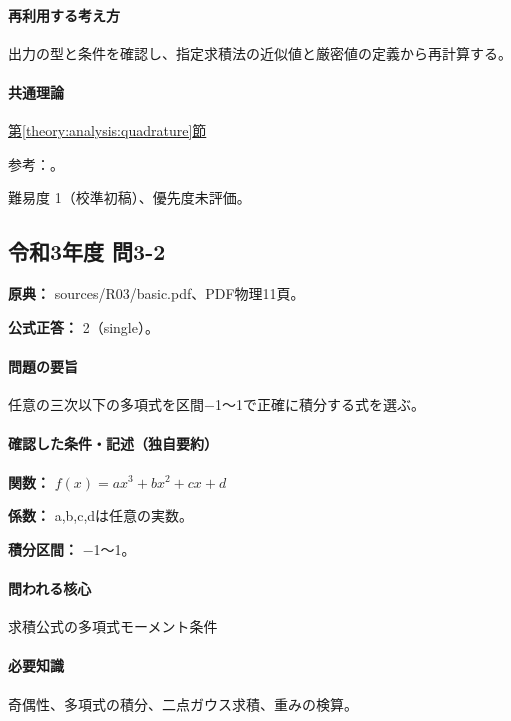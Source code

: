 \paragraph{再利用する考え方} 出力の型と条件を確認し、指定求積法の近似値と厳密値の定義から再計算する。

\paragraph{共通理論} \hyperref[theory:analysis:quadrature]{第\ref*{theory:analysis:quadrature}節}

\par 参考：\cite{nist_quadrature}。

\par 難易度 1（校準初稿）、優先度未評価。

\subsection{令和3年度 問3-2}
\label{q:r03-reg-basic-3-2}

\noindent\textbf{原典：} sources/R03/basic.pdf、PDF物理11頁。

\textbf{公式正答：} 2（single）。

\paragraph{問題の要旨} 任意の三次以下の多項式を区間−1〜1で正確に積分する式を選ぶ。

\paragraph{確認した条件・記述（独自要約）}\mbox{}\par

\noindent\textbf{関数：} \(f(x)=ax^3+bx^2+cx+d\)\par

\noindent\textbf{係数：} a,b,c,dは任意の実数。\par

\noindent\textbf{積分区間：} −1〜1。\par

\paragraph{問われる核心} 求積公式の多項式モーメント条件

\paragraph{必要知識} 奇偶性、多項式の積分、二点ガウス求積、重みの検算。

